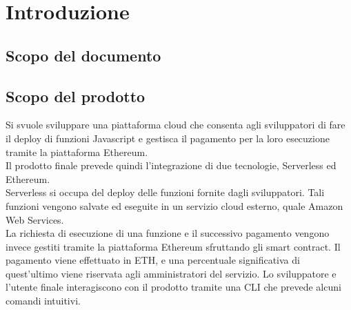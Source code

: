 \section{Introduzione}
\subsection{Scopo del documento}

\subsection{Scopo del prodotto}
	Si svuole sviluppare una piattaforma cloud che consenta agli sviluppatori di fare il deploy di funzioni Javascript e gestisca il pagamento per la loro esecuzione tramite la piattaforma Ethereum.\\
	Il prodotto finale prevede quindi l'integrazione di due tecnologie, Serverless ed Ethereum.\\
	Serverless si occupa del deploy delle funzioni fornite dagli sviluppatori. Tali funzioni vengono salvate ed eseguite in un servizio cloud esterno, quale Amazon Web Services.  \\La richiesta di esecuzione di una funzione e il successivo pagamento vengono invece gestiti tramite la piattaforma Ethereum sfruttando gli smart contract. Il pagamento viene effettuato in ETH, e una percentuale significativa di quest'ultimo viene riservata agli amministratori del servizio. 
	Lo sviluppatore e l'utente finale interagiscono con il prodotto tramite una CLI che prevede alcuni comandi intuitivi.
